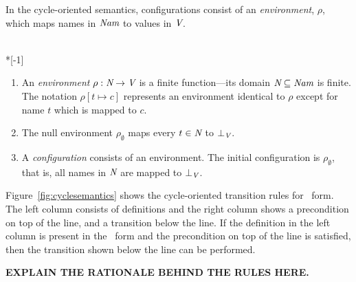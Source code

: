 \documentclass[12pt,titlepage,twoside]{article}
\begin{document}
In the cycle-oriented semantics, configurations consist of an
\emph{environment}, $\rho$, which maps
names in ${\mbox{\em Nam}}$ to values in ${\mbox{\em V}}$.

\begin{definition}~\\*[-1\baselineskip]
\begin{enumerate}
\item An \emph{environment} $\rho: {\mbox{\em N}} \to {\mbox{\em V}}$ is a
finite function---its domain ${\mbox{\em N}} \subseteq {\mbox{\em Nam}}$ is
finite.  The notation $\rho[t\mapsto c]$ represents an environment
identical to $\rho$ except for name $t$ which is mapped to $c$.
\item The null environment $\rho_\emptyset$ maps every $t\in{\mbox{\em N}}$ to
$\bot_{\mbox{\scriptsize\em V}}$.
\item A \emph{configuration} consists of an environment.  The initial
configuration is $\rho_\emptyset$, that is, all names in ${\mbox{\em N}}$
are mapped to $\bot_{\mbox{\scriptsize\em V}}$.
\end{enumerate}
\end{definition}

Figure~\vref{fig:cyclesemantics} shows the cycle-oriented transition
rules for \ssiplus\ form.  The left column consists of definitions and
the right column shows a precondition on top of the line, and a
transition below the line.  If the definition in the left column is
present in the \ssiplus\ form and the precondition on top of the line
is satisfied, then the transition shown below the line can be performed.

\textbf{EXPLAIN THE RATIONALE BEHIND THE RULES HERE.}
\end{document}
